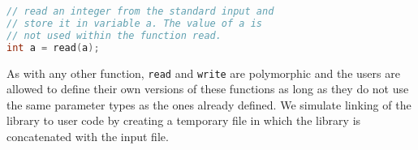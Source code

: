 \begin{lstlisting}[language=C]
// read an integer from the standard input and
// store it in variable a. The value of a is
// not used within the function read.
int a = read(a);
\end{lstlisting}

As with any other function, \texttt{read} and \texttt{write} are polymorphic and the users are
allowed to define their own versions of these functions as long as they do not use the same parameter
types as the ones already defined. We simulate linking of the library to user code by creating a temporary file
in which the library is concatenated with the input file.

